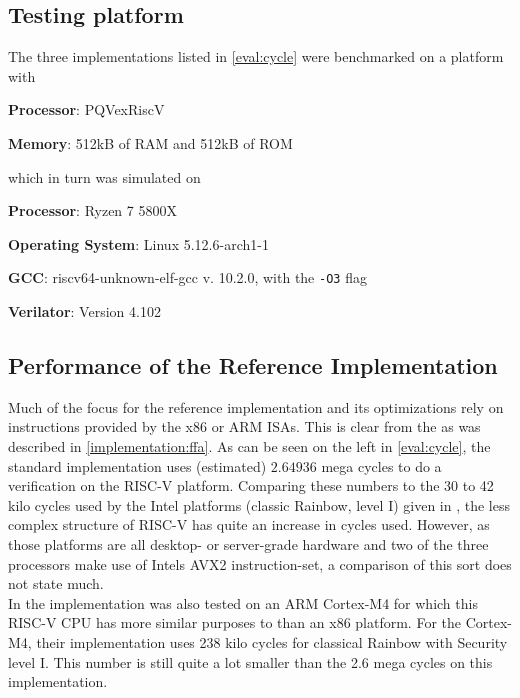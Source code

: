 \subsection{Testing platform}
The three implementations listed in \cref{eval:cycle} were benchmarked on a platform with
\begin{description}
    \item \textbf{Processor}: PQVexRiscV
    \item \textbf{Memory}: 512kB of RAM and 512kB of ROM
\end{description}
which in turn was simulated on
\begin{description}
    \item \textbf{Processor}: Ryzen 7 5800X
    \item \textbf{Operating System}: Linux 5.12.6-arch1-1
    \item \textbf{GCC}: riscv64-unknown-elf-gcc v. 10.2.0, with the \texttt{-O3} flag
    \item \textbf{Verilator}: Version 4.102
\end{description}
\subsection{Performance of the Reference Implementation}
Much of the focus for the reference implementation and its optimizations rely on instructions provided by the x86 or ARM ISAs. This is clear from the \cite{rainbownist} as was described in \cref{implementation:ffa}. As can be seen on the left in \cref{eval:cycle}, the standard implementation uses (estimated) $2.64936$ mega cycles to do a verification on the RISC-V platform. Comparing these numbers to the 30 to 42 kilo cycles used by the Intel platforms (classic Rainbow, level I) given in \cite{rainbownist}, the less complex structure of RISC-V has quite an increase in cycles used. However, as those platforms are all desktop- or server-grade hardware and two of the three processors make use of Intels AVX2 instruction-set, a comparison of this sort does not state much.
\medskip\\
In \cite{rainbownist} the implementation was also tested on an ARM Cortex-M4 for which this RISC-V CPU has more similar purposes to than an x86 platform. For the Cortex-M4, their implementation uses 238 kilo cycles for classical Rainbow with Security level I. This number is still quite a lot smaller than the 2.6 mega cycles on this implementation.
